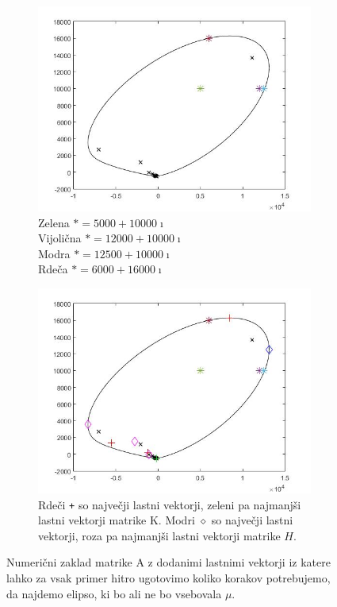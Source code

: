 \documentclass[12pt,a4paper]{amsart}
\theoremstyle{definition}
\theoremstyle{plain}
\begin{document}
\begin{figure}[H]
\begin{subfigure}[t]{0.5\textwidth}
\includegraphics[width=0.9\linewidth]{CC.jpg}
\caption{Zelena $\ast = 5000+10000\imath$\\
Vijolična $\ast = 12000+10000\imath$\\
Modra $\ast = 12500+10000\imath$\\
Rdeča $\ast = 6000+16000\imath$\\}

\end{subfigure}%
\hfill
\begin{subfigure}[t]{0.5\textwidth}
\includegraphics[width=0.9\linewidth]{CCC.jpg}
\caption{Rdeči \verb~+~ so največji lastni vektorji, zeleni pa najmanjši lastni vektorji matrike K. Modri $\diamond$ so največji lastni vektorji, roza pa najmanjši lastni vektorji matrike $H$.\footnotemark[\value{footnote}]}
\end{subfigure}
\caption{Numerični zaklad matrike A z dodanimi lastnimi vektorji iz katere lahko za vsak primer hitro ugotovimo koliko korakov potrebujemo, da najdemo elipso, ki bo ali ne bo vsebovala $\mu$.}
\label{fig:p7}
\end{figure}
\end{document}
